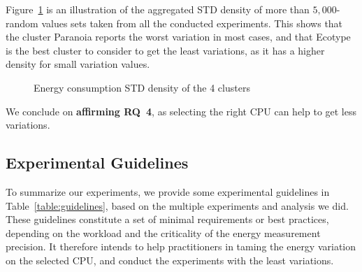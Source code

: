 Figure~\ref{fig:cpugen} is an illustration of the aggregated STD density of more than $5,000$-random values sets taken from all the conducted experiments.
This shows that the cluster \textsf{Paranoia} reports the worst variation in most cases, and that \textsf{Ecotype} is the best cluster to consider to get the least variations, as it has a higher density for small variation values.

\begin{figure}
    \caption{Energy consumption STD density of the 4 clusters}\label{fig:cpugen}
\end{figure}

\begin{mdframed}[skipabove=\topsep,skipbelow=\topsep]
    We conclude on \textbf{affirming \textsc{RQ}~4}, as selecting the right CPU can help to get less variations.
\end{mdframed}





\subsection{Experimental Guidelines}
To summarize our experiments, we provide some experimental guidelines in Table~\ref{table:guidelines}, based on the multiple experiments and analysis we did.
These guidelines constitute a set of minimal requirements or best practices, depending on the workload and the criticality of the energy measurement precision.
It therefore intends to help practitioners in taming the energy variation on the selected CPU, and conduct the experiments with the least variations.

